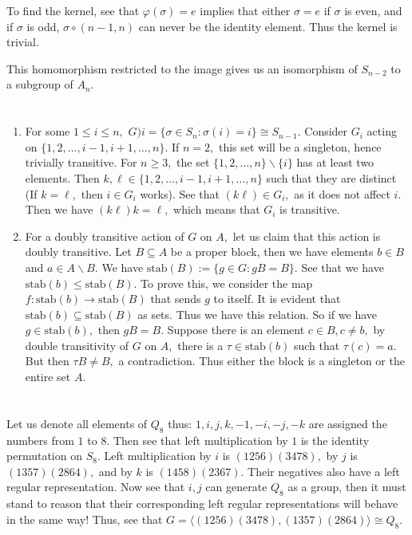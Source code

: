 \documentclass{article}
\begin{document}
To find the kernel, see that $\varphi(\sigma)=e$ implies that either $\sigma=e$ if $\sigma$ is even, and if $\sigma$ is odd, $\sigma \circ (n-1,n)$ can 
never be the identity element. Thus the kernel is trivial.

This homomorphism restricted to the image gives us an isomorphism of $S_{n-2}$ to a subgroup of $A_n.$
\section{} %
\begin{enumerate}
	\item For some $1 \leq i \leq n,$ $G)i=\{\sigma \in S_n: \sigma(i)=i\} \cong S_{n-1}.$ Consider $G_i$ acting on $\{1,2,\dots,i-1,i+1,\dots,n\}.$
	If $n=2,$ this set will be a singleton, hence trivially transitive. For $n \geq 3,$ the set $\{1,2,\dots,n\}\backslash\{i\}$ has at least two elements. 
	Then $k,\ell \in \{1,2,\dots,i-1,i+1,\dots,n\}$ such that they are distinct (If $k=\ell,$ then $i \in G_i$ works). See that $ (k \ell) \in G_i,$ as it 
	does not affect $i.$ Then we have $(k \ell)k=\ell,$ which means that $G_i$ is transitive. 
	\item For a doubly transitive action of $G$ on $A,$ let us claim that this action is doubly transitive. Let $B \subseteq A$ be a proper block, then we 
	have elements $b \in B$ and $a \in A\backslash B.$ We have $\text{stab}(B):= \{g \in G: gB=B\}.$ See that we have $\text{stab}(b) \leq \text{stab}(B).$ 
	To prove this, we consider the map $f: \text{stab}(b) \to \text{stab}(B)$ that sends $g$ to itself. It is evident that $\text{stab}(b) \subseteq 
	\text{stab}(B)$ as sets. Thus we have this relation. So if we have $g \in \text{stab}(b),$ then $gB=B.$ Suppose there is an element $c \in B, c \neq b,$ 
	by double transitivity of $G$ on $A,$ there is a $\tau \in \text{stab}(b)$ such that $\tau(c)=a.$ But then $\tau B \neq B,$ a contradiction. Thus either 
	the block is a singleton or the entire set $A.$
\end{enumerate}
\section{} %
Let us denote all elements of $Q_8$ thus: $1,i,j,k,-1,-i,-j,-k$ are assigned the numbers from $1$ to $8.$ 
Then see that left multiplication by $1$ is the identity permutation on $S_8.$ Left multiplication by $i$ is $(1 2 5 6)(3 4 7 8),$ by $j$ is $(1 3 5 7)(2 8 
6 4),$ and by $k$ is $(1 4 5 8)(2 3 6 7).$ Their negatives also have a left regular representation. Now see that $i,j$ can generate $Q_8$ as a group, then 
it must stand to reason that their corresponding left regular representations will behave in the same way! Thus, see that $G=\langle (1 2 5 6)(3 4 7 8), (1 
3 5 7)(2 8 6 4) \rangle \cong Q_8.$
\end{document}
